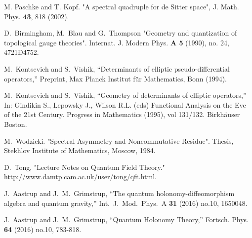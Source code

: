 \documentclass[letterpaper,11pt]{article}
\begin{document}
\begin{thebibliography}{99}
M. Paschke and T. Kopf.
"A spectral quadruple for de Sitter space",
J. Math. Phys. {\bf 43}, 818 (2002).






D.~Birmingham, M.~Blau and G.~Thompson "Geometry and quantization of topological gauge theories". Internat. J. Modern Phys. {\bf A 5} (1990), no. 24, 4721Ð4752.








M.~Kontsevich and S.~Vishik,
``Determinants of elliptic pseudo-differential operators,''
Preprint, Max Planck Institut f\"{u}r Mathematics, Bonn (1994).



M.~Kontsevich and S.~Vishik,
``Geometry of determinants of elliptic operators,''
 In: Gindikin S., Lepowsky J., Wilson R.L. (eds) Functional Analysis on the Eve of the 21st Century. Progress in Mathematics (1995), vol 131/132. Birkh\"{a}user Boston.




M.~Wodzicki. "Spectral Asymmetry and Noncommutative Residue". Thesis, Stekhlov Institute
of Mathematics, Moscow, 1984.







  
   D.~Tong,
   "Lecture Notes on Quantum Field Theory."
http://www.damtp.cam.ac.uk/user/tong/qft.html.









  J.~Aastrup and J.~M.~Grimstrup,
  ``The quantum holonomy-diffeomorphism algebra and quantum gravity,''
  Int.\ J.\ Mod.\ Phys.\ A {\bf 31} (2016) no.10,  1650048.




J.~Aastrup and J.~M.~Grimstrup,
``Quantum Holonomy Theory,''
Fortsch. Phys. \textbf{64} (2016) no.10, 783-818.



























\end{thebibliography}
\end{document}
